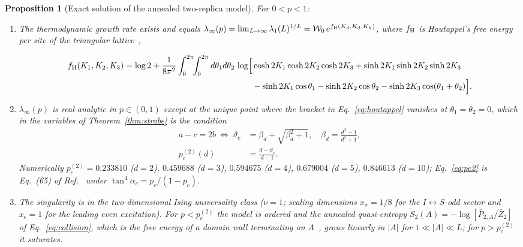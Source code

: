 \documentclass[aps,prx,reprint,superscriptaddress,nobibnotes,longbibliography]{revtex4-2}
\newtheorem{proposition}{Proposition}
\theoremstyle{remark}
\newcommand{\vth}{\vartheta}
\begin{document}
\begin{proposition}[Exact solution of the annealed two-replica model]
\label{prop:houtappel}
For $0<p<1$:
\begin{enumerate}
\item[(a)] The thermodynamic growth rate exists and equals $\lambda_\infty(p)=\lim_{L\to\infty}\lambda_1(L)^{1/L}=\mathcal W_0\,e^{f_{\rm H}(K_d,K_d,K_h)}$, where $f_{\rm H}$ is Houtappel's free energy per site of the triangular lattice~\cite{Houtappel1950,Baxter1982},
\begin{widetext}
\begin{align}
 f_{\rm H}(K_1,K_2,K_3)=\log2+\frac1{8\pi^2}\int_0^{2\pi}\!\!\int_0^{2\pi}d\theta_1d\theta_2\,
 \log\Bigl[&\cosh2K_1\cosh2K_2\cosh2K_3+\sinh2K_1\sinh2K_2\sinh2K_3\nonumber\\
 &-\sinh2K_1\cos\theta_1-\sinh2K_2\cos\theta_2-\sinh2K_3\cos(\theta_1+\theta_2)\Bigr].
 \label{eq:houtappel}
\end{align}
\end{widetext}
\item[(b)] $\lambda_\infty(p)$ is real-analytic in $p\in(0,1)$ except at the unique point where the bracket in Eq.~\eqref{eq:houtappel} vanishes at $\theta_1=\theta_2=0$, which in the variables of Theorem~\ref{thm:strobe} is the condition
\begin{align}
 a-c=2b\ \Longleftrightarrow\ \vth_c&=\beta_d+\sqrt{\beta_d^2+1},\quad \beta_d=\frac{d^2-1}{d^2+1},\nonumber\\
 p_c^{(2)}(d)&=\frac{d-\vth_c}{d-1}.
 \label{eq:pc2}
\end{align}
Numerically $p_c^{(2)}=0.233810$ ($d=2$), $0.459688$ ($d=3$), $0.594675$ ($d=4$), $0.679004$ ($d=5$), $0.846613$ ($d=10$); Eq.~\eqref{eq:pc2} is Eq.~(65) of Ref.~\cite{Bao2020} under $\tan^4\alpha_c=p_c/(1-p_c)$.
\item[(c)] The singularity is in the two-dimensional Ising universality class ($\nu=1$; scaling dimensions $x_\sigma=1/8$ for the $I\leftrightarrow S$-odd sector and $x_\epsilon=1$ for the leading even excitation).  For $p<p_c^{(2)}$ the model is ordered and the annealed quasi-entropy $\tilde S_2(A)=-\log[\bar P_{2,A}/\bar Z_2]$ of Eq.~\eqref{eq:collision}, which is the free energy of a domain wall terminating on $A$~\cite{Bao2020}, grows linearly in $|A|$ for $1\ll|A|\ll L$; for $p>p_c^{(2)}$ it saturates.
\end{enumerate}
\end{proposition}
\end{document}
